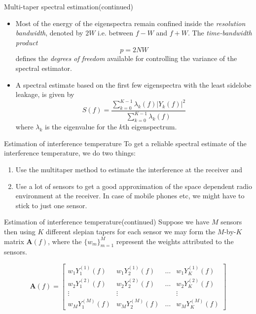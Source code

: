 \documentclass[mathserif]{beamer}
\begin{document}
\begin{frame}{Multi-taper spectral estimation(continued)}

\begin{itemize}

	\item Most of the energy of the eigenspectra remain confined inside the \emph{resolution bandwidth}, denoted by $2W$ i.e. between $f-W$ and $f+W$. The \emph{time-bandwidth product}
\begin{equation*}
    p = 2NW
\end{equation*}
defines the \emph{degrees of freedom} available for controlling the variance of the spectral estimator.

	\item A spectral estimate based on the first few eigenspectra with the least sidelobe leakage, is given by
\begin{equation*}
    \hat{S}(f) = \frac{\sum_{k=0}^{K-1} \lambda_k(f) |Y_k(f)|^2}{\sum_{k=0}^{K-1} \lambda_k(f)}
\end{equation*}
where $\lambda_k$ is the eigenvalue for the $k$th eigenspectrum.

\end{itemize}

\end{frame}


\begin{frame}{Estimation of interference temperature}
To get a reliable spectral estimate of the interference temperature, we do two things:
\begin{enumerate}
    \item Use the multitaper method to estimate the interference at the receiver and
    \item Use a lot of sensors to get a good approximation of the space dependent radio environment at the receiver. In case of mobile phones etc, we might have to stick to just one sensor.
\end{enumerate}

\end{frame}

\begin{frame}{Estimation of interference temperature(continued)}
Suppose we have $M$ sensors then using $K$ different slepian tapers for each sensor we may form the $M$-by-$K$ matrix $\mathbf{A}(f)$, where the $\{w_m\}_{m=1}^M$ represent the weights attributed to the sensors.

\begin{equation*}
    \mathbf{A}(f) = 
    \begin{bmatrix}
        w_1Y_1^{(1)}(f) & w_1Y_2^{(1)}(f) & \ldots & w_1Y_K^{(1)}(f) \\
        w_2Y_1^{(2)}(f) & w_2Y_2^{(2)}(f) & \ldots & w_2Y_K^{(2)}(f) \\
        \vdots & \vdots && \vdots \\
        w_MY_1^{(M)}(f) & w_MY_2^{(M)}(f) & \ldots & w_MY_K^{(M)}(f)
    \end{bmatrix}
\end{equation*}

\end{frame}
\end{document}
